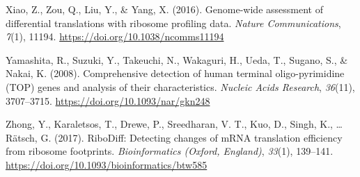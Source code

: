 \documentclass[12pt,openany]{book}
\begin{document}
\hypertarget{ref-Xiao2016}{}
Xiao, Z., Zou, Q., Liu, Y., \& Yang, X. (2016). Genome-wide assessment
of differential translations with ribosome profiling data. \emph{Nature
Communications}, \emph{7}(1), 11194.
\url{https://doi.org/10.1038/ncomms11194}

\hypertarget{ref-Yamashita2008}{}
Yamashita, R., Suzuki, Y., Takeuchi, N., Wakaguri, H., Ueda, T., Sugano,
S., \& Nakai, K. (2008). Comprehensive detection of human terminal
oligo-pyrimidine (TOP) genes and analysis of their characteristics.
\emph{Nucleic Acids Research}, \emph{36}(11), 3707--3715.
\url{https://doi.org/10.1093/nar/gkn248}

\hypertarget{ref-Zhong2017}{}
Zhong, Y., Karaletsos, T., Drewe, P., Sreedharan, V. T., Kuo, D., Singh,
K., \ldots{} Rätsch, G. (2017). RiboDiff: Detecting changes of mRNA
translation efficiency from ribosome footprints. \emph{Bioinformatics
(Oxford, England)}, \emph{33}(1), 139--141.
\url{https://doi.org/10.1093/bioinformatics/btw585}
\end{document}
